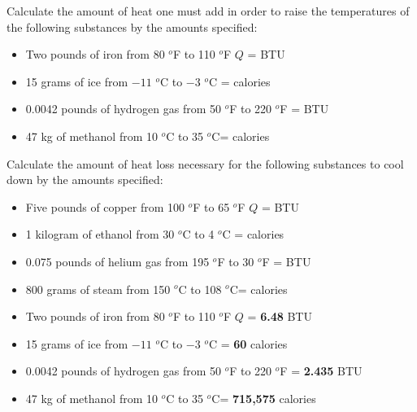 

Calculate the amount of heat one must add in order to raise the temperatures of the following substances by the amounts specified:

\begin{itemize}
\item{} Two pounds of iron from 80 $^{o}$F to 110 $^{o}$F \hskip 10pt $Q$ = \underbar{\hskip 50pt} BTU
\vskip 10pt
\item{} 15 grams of ice from $-11$ $^{o}$C to $-3$ $^{o}$C = \underbar{\hskip 50pt} calories  
\vskip 10pt
\item{} 0.0042 pounds of hydrogen gas from 50 $^{o}$F to 220 $^{o}$F = \underbar{\hskip 50pt} BTU
\vskip 10pt
\item{} 47 kg of methanol from 10 $^{o}$C to 35 $^{o}$C= \underbar{\hskip 50pt} calories 
\end{itemize}

\vskip 20pt

Calculate the amount of heat loss necessary for the following substances to cool down by the amounts specified:

\begin{itemize}
\item{} Five pounds of copper from 100 $^{o}$F to 65 $^{o}$F \hskip 10pt $Q$ = \underbar{\hskip 50pt} BTU
\vskip 10pt
\item{} 1 kilogram of ethanol from 30 $^{o}$C to 4 $^{o}$C = \underbar{\hskip 50pt} calories  
\vskip 10pt
\item{} 0.075 pounds of helium gas from 195 $^{o}$F to 30 $^{o}$F = \underbar{\hskip 50pt} BTU
\vskip 10pt
\item{} 800 grams of steam from 150 $^{o}$C to 108 $^{o}$C= \underbar{\hskip 50pt} calories 
\end{itemize}








\begin{itemize}
\item{} Two pounds of iron from 80 $^{o}$F to 110 $^{o}$F \hskip 10pt $Q$ = {\bf 6.48} BTU
\vskip 10pt
\item{} 15 grams of ice from $-11$ $^{o}$C to $-3$ $^{o}$C = {\bf 60} calories  
\vskip 10pt
\item{} 0.0042 pounds of hydrogen gas from 50 $^{o}$F to 220 $^{o}$F = {\bf 2.435} BTU
\vskip 10pt
\item{} 47 kg of methanol from 10 $^{o}$C to 35 $^{o}$C= {\bf 715,575} calories 
\end{itemize}

